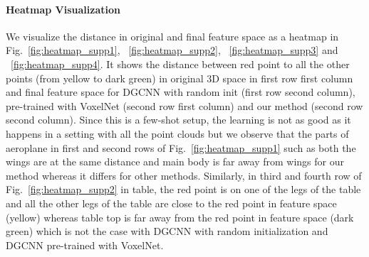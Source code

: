 \documentclass{article}
\begin{document}
\paragraph{Heatmap Visualization}
We visualize the distance in original and final feature space as a heatmap in Fig.~\ref{fig:heatmap_supp1}, ~\ref{fig:heatmap_supp2}, ~\ref{fig:heatmap_supp3} and ~\ref{fig:heatmap_supp4}. It shows the distance between red point to all the other points (from yellow to dark green) in original 3D space in first row first column and final feature space for DGCNN with random init (first row second column), pre-trained with VoxelNet (second row first column) and our method (second row second column). Since this is a few-shot setup, the learning is not as good as it happens in a setting with all the point clouds but we observe that the parts of aeroplane in first and second rows of Fig.~\ref{fig:heatmap_supp1} such as both the wings are at the same distance and main body is far away from wings for our method whereas it differs for other methods. Similarly, in third and fourth row of Fig.~\ref{fig:heatmap_supp2} in table, the red point is on one of the legs of the table and all the other legs of the table are close to the red point in feature space (yellow) whereas table top is far away from the red point in feature space (dark green) which is not the case with DGCNN with random initialization and DGCNN pre-trained with VoxelNet.
\end{document}
